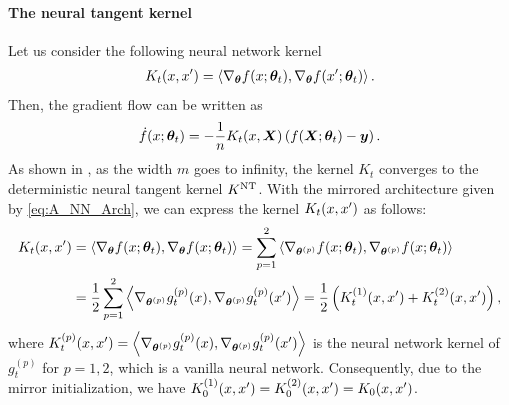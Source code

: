 \paragraph{The neural tangent kernel}
%
Let us consider the following neural network kernel
\begin{align*}
 K_t(x,x') = \left\langle{\nabla_{\bm{\theta}} f(x;\bm{\theta}_t),\nabla_{\bm{\theta}} f(x';\bm{\theta}_t)}\right\rangle.
\end{align*}
Then, the gradient flow can be written as~\citep{jacot2018_NeuralTangent}
\begin{align*}
 \dot{f}(x;\bm{\theta}_t) = - \frac{1}{n} K_t(x,\bm{X})\left(f(\bm{X};\bm{\theta}_t) - \bm{y}\right).
\end{align*}
As shown in \citet{jacot2018_NeuralTangent}, as the width $m$ goes to infinity, the kernel $K_t$ converges to the deterministic neural tangent kernel $K^{\mathrm{NT}}$.
%
%
With the mirrored architecture given by \cref{eq:A_NN_Arch}, we can express the kernel $K_t(x,x')$ as follows:
\begin{align*}
  K_t(x,x')
  &=  \left\langle{\nabla_{\bm{\theta}} f(x;\bm{\theta}_t), \nabla_{\bm{\theta}} f(x;\bm{\theta}_t)}\right\rangle =\sum_{p=1}^2 \left\langle{\nabla_{\bm{\theta}^{(p)}} f(x;\bm{\theta}_t), \nabla_{\bm{\theta}^{(p)}}f(x;\bm{\theta}_t)}\right\rangle \\
  &= \frac{1}{2} \sum_{p=1}^2 \left\langle{\nabla_{\bm{\theta}^{(p)}} g^{(p)}_t(x),\nabla_{\bm{\theta}^{(p)}} g^{(p)}_t(x')}\right\rangle=  \frac{1}{2} \left(K_t^{(1)}(x,x') + K_t^{(2)}(x,x') \right),
\end{align*}
where $K_t^{(p)}(x,x')=\left\langle{\nabla_{\bm{\theta}^{(p)}} g^{(p)}_t(x),\nabla_{\bm{\theta}^{(p)}} g^{(p)}_t(x')}\right\rangle$ is the neural network kernel of $g_t^{(p)}$ for $p=1,2$, which is a vanilla neural network.
Consequently, due to the mirror initialization, we have
$K_0^{(1)}(x,x') = K_0^{(2)}(x,x')= K_0(x,x')$.

